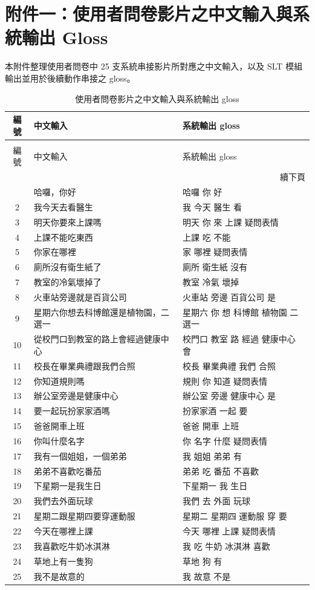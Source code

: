 \documentclass[class=NCU_thesis, crop=false]{standalone}
\begin{document}
\chapter*{附件一：使用者問卷影片之中文輸入與系統輸出 Gloss}
\label{appendix:questionnaire_gloss}

本附件整理使用者問卷中 25 支系統串接影片所對應之中文輸入，以及 SLT 模組輸出並用於後續動作串接之 gloss。

\begin{longtable}{c p{} p{}}
\caption{使用者問卷影片之中文輸入與系統輸出 gloss}
\label{tab:appendix_questionnaire_gloss}\\
\toprule
編號 & 中文輸入 & 系統輸出 gloss \\
\midrule
\endfirsthead
\caption[]{使用者問卷影片之中文輸入與系統輸出 gloss}\\
\toprule
編號 & 中文輸入 & 系統輸出 gloss \\
\midrule
\endhead
\midrule
\multicolumn{3}{r}{續下頁} \\
\endfoot
\bottomrule
\endlastfoot
1 & 哈囉，你好 & 哈囉 你 好 \\
2 & 我今天去看醫生 & 我 今天 醫生 看 \\
3 & 明天你要來上課嗎 & 明天 你 來 上課 疑問表情 \\
4 & 上課不能吃東西 & 上課 吃 不能 \\
5 & 你家在哪裡 & 家 哪裡 疑問表情 \\
6 & 廁所沒有衛生紙了 & 廁所 衛生紙 沒有 \\
7 & 教室的冷氣壞掉了 & 教室 冷氣 壞掉 \\
8 & 火車站旁邊就是百貨公司 & 火車站 旁邊 百貨公司 是 \\
9 & 星期六你想去科博館還是植物園，二選一 & 星期六 你 想 科博館 植物園 二選一 \\
10 & 從校門口到教室的路上會經過健康中心 & 校門口 教室 路 經過 健康中心 會 \\
11 & 校長在畢業典禮跟我們合照 & 校長 畢業典禮 我們 合照 \\
12 & 你知道規則嗎 & 規則 你 知道 疑問表情 \\
13 & 辦公室旁邊是健康中心 & 辦公室 旁邊 健康中心 是 \\
14 & 要一起玩扮家家酒嗎 & 扮家家酒 一起 要 \\
15 & 爸爸開車上班 & 爸爸 開車 上班 \\
16 & 你叫什麼名字 & 你 名字 什麼 疑問表情 \\
17 & 我有一個姐姐，一個弟弟 & 我 姐姐 弟弟 有 \\
18 & 弟弟不喜歡吃番茄 & 弟弟 吃 番茄 不喜歡 \\
19 & 下星期一是我生日 & 下星期一 我 生日 \\
20 & 我們去外面玩球 & 我們 去 外面 玩球 \\
21 & 星期二跟星期四要穿運動服 & 星期二 星期四 運動服 穿 要 \\
22 & 今天在哪裡上課 & 今天 哪裡 上課 疑問表情 \\
23 & 我喜歡吃牛奶冰淇淋 & 我 吃 牛奶 冰淇淋 喜歡 \\
24 & 草地上有一隻狗 & 草地 狗 有 \\
25 & 我不是故意的 & 我 故意 不是 \\
\end{longtable}
\end{document}
